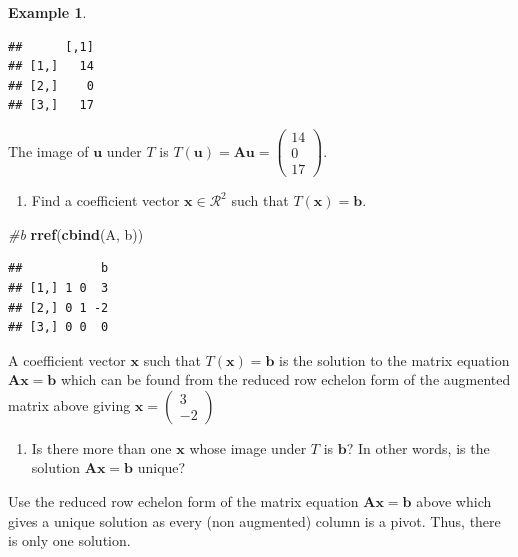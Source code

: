 \documentclass[
]{book}
\newenvironment{Shaded}{\begin{snugshade}}{\end{snugshade}}
\newcommand{\CommentTok}[1]{\textcolor[rgb]{0.56,0.35,0.01}{\textit{#1}}}
\newcommand{\KeywordTok}[1]{\textcolor[rgb]{0.13,0.29,0.53}{\textbf{#1}}}
\newcommand{\NormalTok}[1]{#1}
\providecommand{\tightlist}{%
  \setlength{\itemsep}{0pt}\setlength{\parskip}{0pt}}
\theoremstyle{definition}
\theoremstyle{definition}
\newtheorem{example}{Example}[chapter]
\theoremstyle{definition}
\theoremstyle{remark}
\begin{document}
\begin{example}
\begin{verbatim}
##      [,1]
## [1,]   14
## [2,]    0
## [3,]   17
\end{verbatim}

The image of \(\mathbf{u}\) under \(T\) is \(T(\mathbf{u}) = \mathbf{A} \mathbf{u} = \begin{pmatrix} 14 \\ 0 \\ 17 \end{pmatrix}\).

\begin{enumerate}
\def\labelenumi{\alph{enumi})}
\setcounter{enumi}{1}
\tightlist
\item
  Find a coefficient vector \(\mathbf{x} \in \mathcal{R}^2\) such that \(T(\mathbf{x}) = \mathbf{b}\).
\end{enumerate}

\begin{Shaded}
\begin{Highlighting}[]
\CommentTok{#b}
\KeywordTok{rref}\NormalTok{(}\KeywordTok{cbind}\NormalTok{(A, b))}
\end{Highlighting}
\end{Shaded}

\begin{verbatim}
##           b
## [1,] 1 0  3
## [2,] 0 1 -2
## [3,] 0 0  0
\end{verbatim}

A coefficient vector \(\mathbf{x}\) such that \(T(\mathbf{x}) = \mathbf{b}\) is the solution to the matrix equation \(\mathbf{A} \mathbf{x} = \mathbf{b}\) which can be found from the reduced row echelon form of the augmented matrix above giving \(\mathbf{x} = \begin{pmatrix} 3 \\ -2 \end{pmatrix}\)

\begin{enumerate}
\def\labelenumi{\alph{enumi})}
\setcounter{enumi}{2}
\tightlist
\item
  Is there more than one \(\mathbf{x}\) whose image under \(T\) is \(\mathbf{b}?\) In other words, is the solution \(\mathbf{A} \mathbf{x}= \mathbf{b}\) unique?
\end{enumerate}

Use the reduced row echelon form of the matrix equation \(\mathbf{A} \mathbf{x} = \mathbf{b}\) above which gives a unique solution as every (non augmented) column is a pivot. Thus, there is only one solution.


\end{example}
\end{document}
